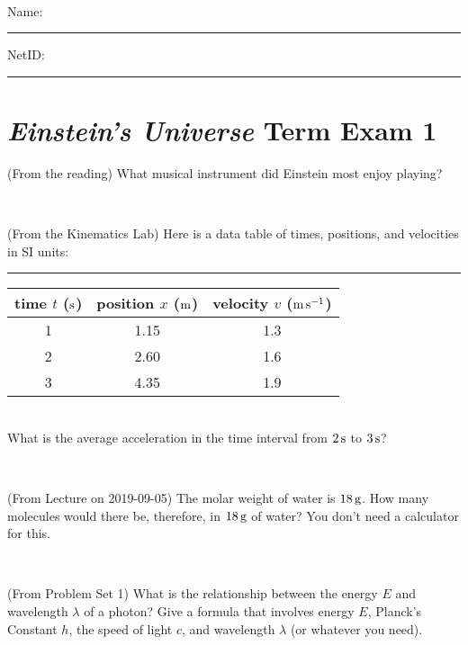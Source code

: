 \documentclass[12pt, letterpaper]{article}
\begin{document}
\vfill ~


\cleardoublepage



\noindent
Name: \rule[-1ex]{0.60\textwidth}{0.1pt}
NetID: \rule[-1ex]{0.20\textwidth}{0.1pt}

\section*{\textsl{Einstein's Universe} Term Exam 1}
\setcounter{problem}{1}


\begin{problem} (From the reading)
What musical instrument did Einstein most enjoy playing?
\end{problem}


\vfill ~

\begin{problem} (From the Kinematics Lab)
Here is a data table of times, positions, and velocities in SI units:\\
\rule{1.0in}{0pt}\begin{tabular}{c|c|c}
time $t$ ($\mathrm{s}$) & position $x$ ($\mathrm{m}$) & velocity $v$ ($\mathrm{m}\,\mathrm{s}^{-1}$) \\
\hline
1 & 1.15 & 1.3 \\
2 & 2.60 & 1.6 \\
3 & 4.35 & 1.9 \\
\hline
\end{tabular}\\
What is the average acceleration in the time interval from $2\,\mathrm{s}$ to $3\,\mathrm{s}$?
\end{problem}


\vfill ~

\begin{problem} (From Lecture on 2019-09-05)
The molar weight of water is $18\,\mathrm{g}$. How many molecules would there
be, therefore, in $18\,\mathrm{g}$ of water? You don't need a calculator for
this.
\end{problem}


\vfill ~

\begin{problem} (From Problem Set 1)
What is the relationship between the energy $E$ and wavelength
$\lambda$ of a photon? Give a formula that involves energy $E$,
Planck's Constant $h$, the speed of light $c$, and wavelength
$\lambda$ (or whatever you need).
\end{problem}

\vfill ~


\clearpage
\end{document}
